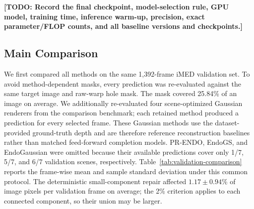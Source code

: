 \documentclass[letterpaper,10pt,conference]{ieeeconf}
\newcommand{\todo}[1]{\textcolor{todoRed}{\textbf{[TODO: #1]}}}
\begin{document}
\todo{Record the final checkpoint, model-selection rule, GPU model, training
time, inference warm-up, precision, exact parameter/FLOP counts, and all
baseline versions and checkpoints.}

\subsection{Main Comparison}

We first compared all methods on the same 1,392-frame iMED validation set. To
avoid method-dependent masks, every prediction was re-evaluated against the
same target image and raw-warp hole mask. The mask covered 25.84\% of an image
on average. We additionally re-evaluated four scene-optimized Gaussian
renderers from the comparison benchmark; each retained method produced a
prediction for every selected frame. These Gaussian methods use the
dataset-provided ground-truth depth and are therefore reference reconstruction
baselines rather than matched feed-forward completion models. PR-ENDO,
EndoGS, and EndoGaussian were omitted because their available predictions cover
only 1/7, 5/7, and 6/7 validation scenes, respectively.
Table~\ref{tab:validation-comparison} reports the frame-wise mean and sample
standard deviation under this common protocol.
The deterministic small-component repair affected
$1.17\pm0.94$\% of image pixels per validation frame on average; the 2\%
criterion applies to each connected component, so their union may be larger.
\end{document}
